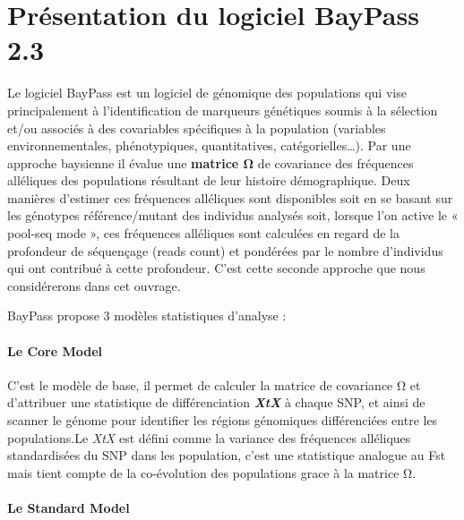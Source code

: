 \documentclass[
  openany]{book}
\theoremstyle{definition}
\theoremstyle{definition}
\theoremstyle{definition}
\theoremstyle{definition}
\theoremstyle{remark}
\begin{document}
\hypertarget{pruxe9sentation-du-logiciel-baypass-2.3}{%
\chapter*{Présentation du logiciel BayPass 2.3}\label{pruxe9sentation-du-logiciel-baypass-2.3}}

Le logiciel BayPass est un logiciel de génomique des populations qui vise principalement à l'identification de marqueurs génétiques soumis à la sélection et/ou associés à des covariables spécifiques à la population (variables environnementales, phénotypiques, quantitatives, catégorielles\ldots). Par une approche baysienne il évalue une \textbf{matrice Ω} de covariance des fréquences alléliques des populations résultant de leur histoire démographique. Deux manières d'estimer ces fréquences alléliques sont disponibles soit en se basant sur les génotypes référence/mutant des individus analysés soit, lorsque l'on active le « pool-seq mode », ces fréquences alléliques sont calculées en regard de la profondeur de séquençage (reads count) et pondérées par le nombre d'individus qui ont contribué à cette profondeur. C'est cette seconde approche que nous considérerons dans cet ouvrage.

BayPass propose 3 modèles statistiques d'analyse :

\hypertarget{le-core-model}{%
\subsubsection*{Le Core Model}\label{le-core-model}}

C'est le modèle de base, il permet de calculer la matrice de covariance Ω et d'attribuer une statistique de différenciation \textbf{\emph{XtX}} à chaque SNP, et ainsi de scanner le génome pour identifier les régions génomiques différenciées entre les populations.Le \emph{XtX} est défini comme la variance des fréquences alléliques standardisées du SNP dans les population, c'est une statistique analogue au Fst mais tient compte de la co-évolution des populations grace à la matrice Ω.

\hypertarget{le-standard-model}{%
\subsubsection*{Le Standard Model}\label{le-standard-model}}
\end{document}

